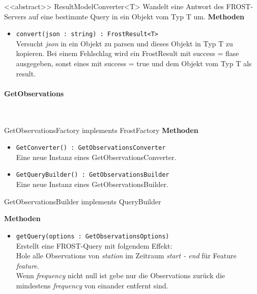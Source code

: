 \begin{Class}{<<abstract>> ResultModelConverter<T>}
    Wandelt eine Antwort des FROST-Servers auf eine bestimmte Query in ein Objekt vom Typ T um.
    \textbf{Methoden}
    \begin{itemize}
        \item \texttt{convert(json : string) : FrostResult<T>}
        \\ Versucht \emph{json} in ein Objekt zu parsen und dieses Objekt in Typ T zu kopieren.
        Bei einem Fehlschlag wird ein FrostResult mit success = flase ausgegeben, sonst eines mit success = true und dem Objekt vom Typ T als result.
    \end{itemize}
\end{Class}

\paragraph{GetObservations}\mbox{}\\
\begin{Class}{GetObservationsFactory implements FrostFactory}
    \textbf{Methoden}
    \begin{itemize}
        \item \texttt{GetConverter() : GetObservationsConverter}
        \\ Eine neue Instanz eines GetObservationsConverter.
        \item \texttt{GetQueryBuilder() : GetObservationsBuilder}
        \\ Eine neue Instanz eines GetObservationsBuilder.
    \end{itemize}
\end{Class}

\begin{Class}{GetObservationsBuilder implements QueryBuilder}

    \textbf{Methoden}
    \begin{itemize}
        \item \texttt{getQuery(options : GetObservationsOptions)}
        \\ Erstellt eine FROST-Query mit folgendem Effekt:
        \\ Hole alle Observations von \emph{station} im Zeitraum \emph{start - end}
        für Feature \emph{feature}.
        \\ Wenn \emph{frequency} nicht null ist gebe nur die Observations zurück 
        die mindestens \emph{frequency} von einander entfernt sind.
    \end{itemize}
\end{Class}

